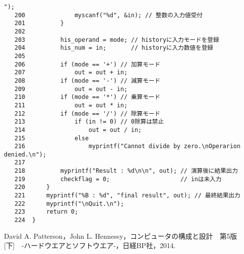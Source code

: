 \begin{Verbatim}[fontsize=\small, baselinestretch=0.8]
 ");
   200	            myscanf("%d", &in); // 整数の入力値受付
   201	        }
   202	
   203	        his_operand = mode; // historyに入力モードを登録
   204	        his_num = in;       // historyに入力数値を登録
   205	
   206	        if (mode == '+') // 加算モード
   207	            out = out + in;
   208	        if (mode == '-') // 減算モード
   209	            out = out - in;
   210	        if (mode == '*') // 乗算モード
   211	            out = out * in;
   212	        if (mode == '/') // 除算モード
   213	            if (in != 0) // 0除算は禁止
   214	                out = out / in;
   215	            else
   216	                myprintf("Cannot divide by zero.\nOperarion denied.\n");
   217	
   218	        myprintf("Result : %d\n\n", out); // 演算後に結果出力
   219	        checkflag = 0;                    // inは未入力
   220	    }
   221	    myprintf("%B : %d", "final result", out); // 最終結果出力
   222	    myprintf("\nQuit.\n");
   223	    return 0;
   224	}
\end{Verbatim}

\begin{thebibliography}{99}
   David A. Patterson，John L. Hennessy，コンピュータの構成と設計　第5版[下]　-ハードウエアとソフトウエア-，日経BP社，2014.
\end{thebibliography}



